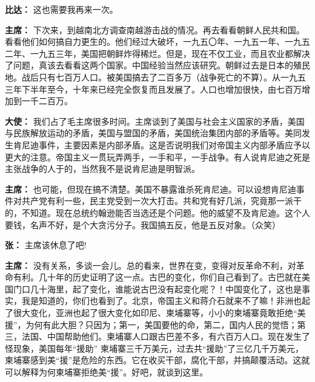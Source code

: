 \begin{duihua}
\item[\textbf{比达：}] 这也需要我再来一次。

\item[\textbf{主席：}] 下次来，到越南北方调查南越游击战的情况。再去看看朝鲜人民共和国。看看他们如何搞自力更生的。他们经过大破坏，一九五〇年、一九五一年、一九五二年、一九五三年，美国把朝鲜炸得稀烂。但是，现在不仅工业，而且农业都解决了问题，真该去看看这两个国家。中国经验当然应该研究。朝鲜过去是日本的殖民地。战后只有七百万人口。被美国搞去了二百多万（战争死亡的不算）。从一九五三年下半年至今，十年来已经完全恢复而且发展了。人口也增加很快，由七百万增加到一千二百万。

\item[\textbf{大使：}] 我们占了毛主席很多时间。主席谈到了美国与社会主义国家的矛盾，美国与民族解放运动的矛盾，美国与盟国的矛盾，美国统治集团内部的矛盾等。美同发生肯尼迪事件，主要因素是内部矛盾。这是否说明我们对帝国主义内部矛盾应予以更大的注意。帝国主义一贯玩弄两手，一手和平，一手战争。有人说肯尼迪之死是主张战争的人于的，当然我不是说肯尼迪是明智派。

\item[\textbf{主席：}] 也可能，但现在搞不清楚。美国不暴露谁杀死肯尼迪。可以设想肯尼迪事件对共产党有利一些，民主党受到一次大打击。共和党有好几派，究竟那一派干的，不知道。现在总统约翰逊能否当选还是个问题。他的威望不及肯尼迪。这个人要钱，名声不好，是个大贪污分子。我国搞五反，他是五反对象。（众笑）

\item[\textbf{张：}] 主席该休息了吧!

\item[\textbf{主席：}] 没有关系，多谈一会儿。总的看来，世界在变，变得对反革命不利，对革命有利。几十年的历史证明了这一点。古巴的变化，你们自己看到了。古巴就在美国门口几十海里，起了变化，谁能说古巴没有起变化呢？！中国变化了，这也是事实，我是知道的，你们也看到了。北京，帝国主义和蒋介石就来不了嘛！非洲也起了很大变化，亚洲也起了很大变化如印尼、柬埔寨等，小小的柬埔寨竟敢拒绝“美援”，为何有此大胆？只因为；第一，美国要他的命，第二，国内人民的觉悟；第三，法国、中国帮助他们。柬埔寨人口跟古巴差不多，有六百万人口。现在发生了怪现象，美国每年“援助” 柬埔寨三千万美元，过去共“援助”了三亿几千万美元，柬埔寨感到美“援”是危险的东西。它在收买干部，腐化干部，并搞颠覆活动。这就可以解释为何柬埔寨拒绝美“援”。好吧，就谈到这里。
\end{duihua}

